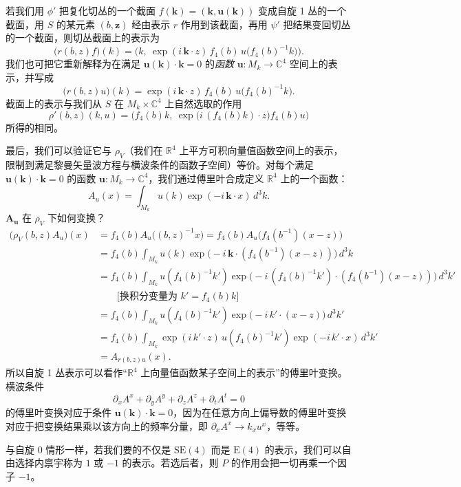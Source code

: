 若我们用 $\phi'$ 把复化切丛的一个截面 $f(\mathbf{k})=(\mathbf{k},\mathbf{u}(\mathbf{k}))$ 变成自旋 1 丛的一个截面，用 $S$ 的某元素 $(b,\mathbf{z})$ 经由表示 $r$ 作用到该截面，再用 $\psi'$ 把结果变回切丛的一个截面，则切丛截面上的表示为
\[
\big(r(b,z)f\big)(k)=\big(k,\ \exp(i\,\mathbf{k}\cdot z)\,f_4(b)\,u\big(f_4(b)^{-1}k\big)\big).
\]
我们也可把它重新解释为在满足 $\mathbf{u}(\mathbf{k})\cdot\mathbf{k}=0$ 的\emph{函数} $\mathbf{u}:M_k\to\mathbb{C}^4$ 空间上的表示，并写成
\[
\big(r(b,z)u\big)(k)=\exp(i\,\mathbf{k}\cdot z)\,f_4(b)\,u\big(f_4(b)^{-1}k\big).
\]
截面上的表示与我们从 $S$ 在 $M_k\times\mathbb{C}^4$ 上自然选取的作用
\[
\rho'(b,z)(k,u)=\big(f_4(b)k,\ \exp\big(i\,(f_4(b)k)\cdot z\big)f_4(b)u\big)
\]
所得的相同。

最后，我们可以验证它与 $\rho_V$（我们在 $\mathbb{R}^4$ 上平方可积向量值函数空间上的表示，限制到满足黎曼矢量波方程与横波条件的函数子空间）等价。对每个满足 $\mathbf{u}(\mathbf{k})\cdot\mathbf{k}=0$ 的函数 $\mathbf{u}:M_k\to\mathbb{C}^4$，我们通过傅里叶合成定义 $\mathbb{R}^4$ 上的一个函数：
\[
A_u(x)=\int_{M_k}u(k)\exp(-i\,\mathbf{k}\cdot x)\,d^3k .
\]
$\mathbf{A}_{\mathbf{u}}$ 在 $\rho_V$ 下如何变换？
\begin{align*}
\big(\rho_V(b,z)A_u\big)(x)
&=f_4(b)A_u\big((b,z)^{-1}x\big)=f_4(b)A_u\big(f_4(b^{-1})(x-z)\big)\\
&=f_4(b)\int_{M_k}u(k)\exp\big(-i\,\mathbf{k}\cdot(f_4(b^{-1})(x-z))\big)\,d^3k\\
&=f_4(b)\int_{M_k}u(f_4(b)^{-1}k')\exp\big(-i\,(f_4(b)^{-1}k')\cdot(f_4(b^{-1})(x-z))\big)\,d^3k'\\
&\qquad\text{[换积分变量为 $k'=f_4(b)k$]}\\
&=f_4(b)\int_{M_k}u(f_4(b)^{-1}k')\exp\big(-i\,k'\cdot(x-z)\big)\,d^3k'\\
&=f_4(b)\int_{M_k}\exp(i\,k'\cdot z)\,u(f_4(b)^{-1}k')\exp(-i\,k'\cdot x)\,d^3k'\\
&=A_{r(b,z)u}(x).
\end{align*}
所以自旋 1 丛表示可以看作“$\mathbb{R}^4$ 上向量值函数某子空间上的表示”的傅里叶变换。横波条件
\[
\partial_x A^x+\partial_y A^y+\partial_z A^z+\partial_t A^t=0
\]
的傅里叶变换对应于条件 $\mathbf{u}(\mathbf{k})\cdot\mathbf{k}=0$，因为在任意方向上偏导数的傅里叶变换对应于把变换结果乘以该方向上的频率分量，即 $\partial_x A^x\to k_x u^x$，等等。

与自旋 0 情形一样，若我们要的不仅是 $\mathrm{SE}(4)$ 而是 $\mathrm{E}(4)$ 的表示，我们可以自由选择内禀宇称为 $1$ 或 $-1$ 的表示。若选后者，则 $P$ 的作用会把一切再乘一个因子 $-1$。

